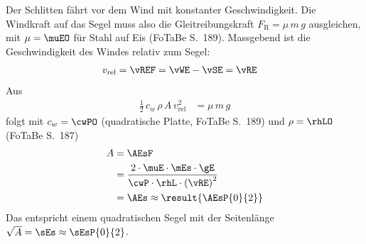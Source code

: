 Der Schlitten fährt vor dem Wind mit konstanter Geschwindigkeit. Die Windkraft auf das Segel muss also die Gleitreibungskraft $F_\text{R} = \mu\,m\,g$ ausgleichen, mit $\mu = \muEO$ für Stahl auf Eis (FoTaBe S.~189). Massgebend ist die Geschwindigkeit des Windes relativ zum Segel:
\begin{align}
 v_\text{rel} &= \vREF = \vWE-\vSE = \vRE
\end{align}
Aus
\begin{align}
 \frac{1}{2}\,c_w\,\rho\,A\,v_\text{rel}^2 &= \mu\,m\,g
\end{align}
folgt mit $c_w = \cwPO$ (quadratische Platte, FoTaBe S.~189) und $\rho = \rhLO$ (FoTaBe S.~187)
\begin{align}
 A &= \AEsF \\
   &= \frac{2\cdot\muE\cdot\mEs\cdot\gE}{\cwP\cdot\rhL\cdot\left(\vRE\right)^2} \\
   &= \AEs \approx \result{\AEsP{0}{2}}
\end{align}
Das entspricht einem quadratischen Segel mit der Seitenlänge $\sqrt{A} = \sEs \approx \sEsP{0}{2}$.
